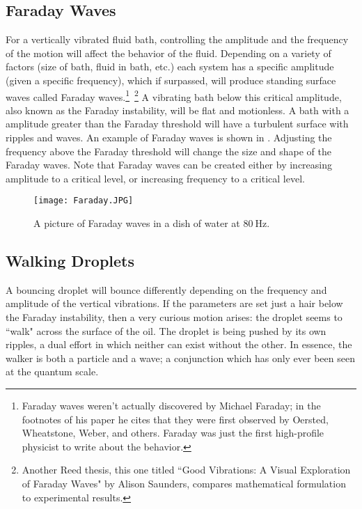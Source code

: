 \subsection{Faraday Waves}
	    For a vertically vibrated fluid bath, controlling the amplitude and the frequency of the motion will affect the behavior of the fluid. Depending on a variety of factors (size of bath, fluid in bath, etc.) each system has a specific amplitude (given a specific frequency), which if surpassed, will produce standing surface waves called Faraday waves.\footnote{Faraday waves weren't actually discovered by Michael Faraday; in the footnotes of his paper he cites that they were first observed by Oersted, Wheatstone, Weber, and others. Faraday was just the first high-profile physicist to write about the behavior.}~\footnote{Another Reed thesis, this one titled ``Good Vibrations: A Visual Exploration of Faraday Waves" by Alison Saunders, compares mathematical formulation to experimental results.} A vibrating bath below this critical amplitude, also known as the Faraday instability, will be flat and motionless. A bath with a amplitude greater than the Faraday threshold will have a turbulent surface with ripples and waves. An example of Faraday waves is shown in . Adjusting the frequency above the Faraday threshold will change the size and shape of the Faraday waves. Note that Faraday waves can be created either by increasing amplitude to a critical level, or increasing frequency to a critical level.
	    
	    \begin{figure}[h!]
	\centering
	\texttt{[image: Faraday.JPG]}
	\caption{A picture of Faraday waves in a dish of water at $80~\mathrm{Hz}$.}
	\label{faraday waves}
\end{figure}

\subsection{Walking Droplets}
	    
	A bouncing droplet will bounce differently depending on the frequency and amplitude of the vertical vibrations. If the parameters are set just a hair below the Faraday instability, then a very curious motion arises: the droplet seems to ``walk" across the surface of the oil. The droplet is being pushed by its own ripples, a dual effort in which neither can exist without the other. In essence, the walker is both a particle and a wave; a conjunction which has only ever been seen at the quantum scale. 
	  
